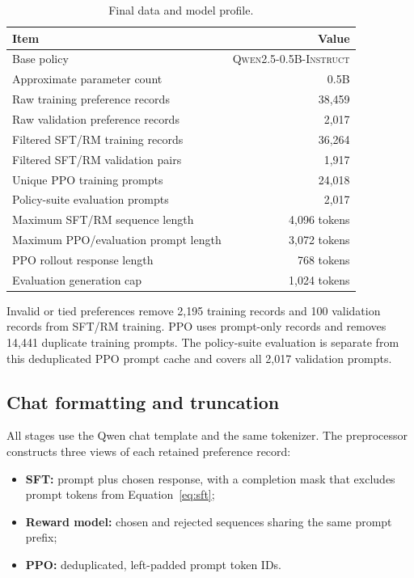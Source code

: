 \documentclass[11pt]{article}
\newcommand{\model}{\textsc{Qwen2.5-0.5B-Instruct}}
\begin{document}
\begin{table}[H]
\centering
\caption{Final data and model profile.}
\label{tab:data-profile}
\begin{tabularx}{0.88\textwidth}{@{}Y r@{}}
\toprule
\textbf{Item} & \textbf{Value}\\
\midrule
Base policy & \model{}\\
Approximate parameter count & 0.5B\\
Raw training preference records & 38,459\\
Raw validation preference records & 2,017\\
Filtered SFT/RM training records & 36,264\\
Filtered SFT/RM validation pairs & 1,917\\
Unique PPO training prompts & 24,018\\
Policy-suite evaluation prompts & 2,017\\
Maximum SFT/RM sequence length & 4,096 tokens\\
Maximum PPO/evaluation prompt length & 3,072 tokens\\
PPO rollout response length & 768 tokens\\
Evaluation generation cap & 1,024 tokens\\
\bottomrule
\end{tabularx}
\end{table}

Invalid or tied preferences remove 2,195 training records and 100 validation
records from SFT/RM training. PPO uses prompt-only records and removes 14,441
duplicate training prompts. The policy-suite evaluation is separate from this
deduplicated PPO prompt cache and covers all 2,017 validation prompts.

\subsection{Chat formatting and truncation}

All stages use the Qwen chat template and the same tokenizer. The preprocessor
constructs three views of each retained preference record:

\begin{itemize}
  \item \textbf{SFT:} prompt plus chosen response, with a completion mask that
  excludes prompt tokens from Equation~\ref{eq:sft};
  \item \textbf{Reward model:} chosen and rejected sequences sharing the same
  prompt prefix;
  \item \textbf{PPO:} deduplicated, left-padded prompt token IDs.
\end{itemize}
\end{document}
